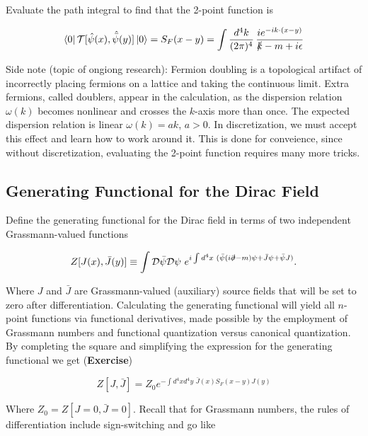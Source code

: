 \noindent Evaluate the path integral to find that the 2-point function is

\begin{equation}
\bra{0} \mathcal{T} [ \hat{\psi} (x), \hat{\bar{\psi}} (y) ] \ket{0} = S_F (x-y) = \int \frac{d^4 k}{(2 \pi)^4} \, \frac{i e^{-i k \cdot (x-y)}}{\slashed{k} - m +i \epsilon}
\end{equation}

\noindent Side note (topic of ongiong research): Fermion doubling is a topological artifact of incorrectly placing fermions on a lattice and taking the continuous limit. Extra fermions, called doublers, appear in the calculation, as the dispersion relation $\omega (k)$ becomes nonlinear and crosses the $k$-axis more than once. The expected dispersion relation is linear $\omega (k) = a k$, $a > 0$. In discretization, we must accept this effect and learn how to work around it. This is done for conveience, since without discretization, evaluating the 2-point function requires many more tricks.

\subsection*{Generating Functional for the Dirac Field}

\noindent Define the generating functional for the Dirac field in terms of two independent Grassmann-valued functions 

\begin{equation}
Z[J(x),\bar{J}(y)] \equiv \int \mathcal{D} \bar{\psi} \mathcal{D} \psi \,\, e^{i \int d^4 x \,\, ( \bar{\psi} (i \slashed{\partial} - m ) \psi + \bar{J} \psi + \bar{\psi} J )} .
\end{equation}

\noindent Where $J$ and $\bar{J}$ are Grassmann-valued (auxiliary) source fields that will be set to zero after differentiation. Calculating the generating functional will yield all $n$-point functions via functional derivatives, made possible by the employment of Grassmann numbers and functional quantization versus canonical quantization. By completing the square and simplifying the expression for the generating functional we get (\textbf{Exercise})

\begin{equation}
Z[J,\bar{J}] = Z_0 e^{-\int d^4 x d^4 y \,\, \bar{J} (x) S_F (x-y) J(y) }
\end{equation}

\noindent Where $Z_0 = Z [ J=0, \bar{J} = 0]$. Recall that for Grassmann numbers, the rules of differentiation include sign-switching and go like

